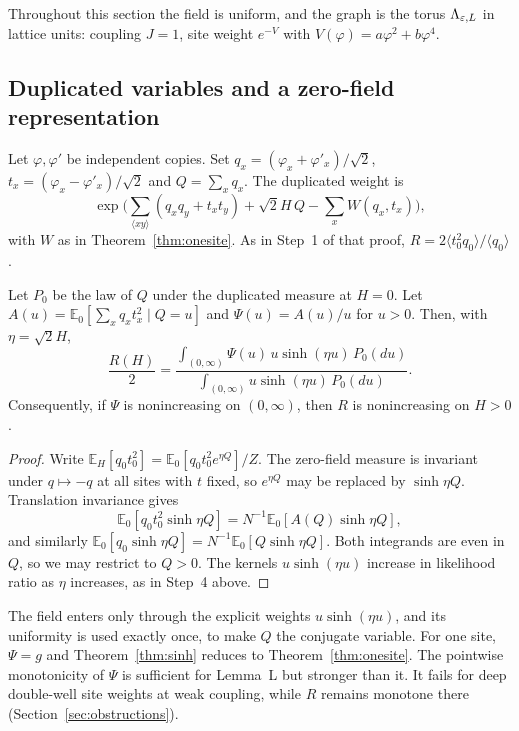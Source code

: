 Throughout this section the field is uniform, and the graph is the torus $\Lambda_{\varepsilon,L}$ in lattice units: coupling $J=1$, site weight $e^{-V}$ with $V(\varphi)=a\varphi^2+b\varphi^4$.

\subsection{Duplicated variables and a zero-field representation}
Let $\varphi,\varphi'$ be independent copies. Set $q_x=(\varphi_x+\varphi'_x)/\sqrt2$, $t_x=(\varphi_x-\varphi'_x)/\sqrt2$ and $Q=\sum_xq_x$. The duplicated weight is
\[
\exp\Big(\sum_{\langle xy\rangle}(q_xq_y+t_xt_y)+\sqrt2H\,Q-\sum_xW(q_x,t_x)\Big),
\]
with $W$ as in Theorem~\ref{thm:onesite}. As in Step~1 of that proof, $R=2\langle t_0^2q_0\rangle/\langle q_0\rangle$.

\begin{theorem}\label{thm:sinh}
Let $P_0$ be the law of $Q$ under the duplicated measure at $H=0$. Let $A(u)=\mathbb E_0[\sum_xq_xt_x^2\mid Q=u]$ and $\Psi(u)=A(u)/u$ for $u>0$. Then, with $\eta=\sqrt2H$,
\[
\frac{R(H)}2=\frac{\int_{(0,\infty)}\Psi(u)\,u\sinh(\eta u)\,P_0(du)}{\int_{(0,\infty)}u\sinh(\eta u)\,P_0(du)} .
\]
Consequently, if $\Psi$ is nonincreasing on $(0,\infty)$, then $R$ is nonincreasing on $H>0$.
\end{theorem}

\begin{proof}
Write $\mathbb E_H[q_0t_0^2]=\mathbb E_0[q_0t_0^2e^{\eta Q}]/Z$. The zero-field measure is invariant under $q\mapsto-q$ at all sites with $t$ fixed, so $e^{\eta Q}$ may be replaced by $\sinh\eta Q$. Translation invariance gives
\[
\mathbb E_0[q_0t_0^2\sinh\eta Q]=N^{-1}\mathbb E_0[A(Q)\sinh\eta Q],
\]
and similarly $\mathbb E_0[q_0\sinh\eta Q]=N^{-1}\mathbb E_0[Q\sinh\eta Q]$. Both integrands are even in $Q$, so we may restrict to $Q>0$. The kernels $u\sinh(\eta u)$ increase in likelihood ratio as $\eta$ increases, as in Step~4 above.
\end{proof}

The field enters only through the explicit weights $u\sinh(\eta u)$, and its uniformity is used exactly once, to make $Q$ the conjugate variable. For one site, $\Psi=g$ and Theorem~\ref{thm:sinh} reduces to Theorem~\ref{thm:onesite}. The pointwise monotonicity of $\Psi$ is sufficient for Lemma~L but stronger than it. It fails for deep double-well site weights at weak coupling, while $R$ remains monotone there (Section~\ref{sec:obstructions}).

